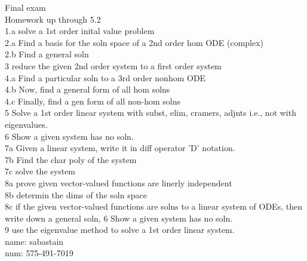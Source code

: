 \documentclass[12pt,a4paper]{article}
\theoremstyle{definition}
\begin{document}
\newpage

Final exam \\
Homework up through 5.2 \\

1.a solve a 1st order inital value problem \\
2.a Find a basis for the soln space of a 2nd order hom ODE (complex)\\
2.b Find a general soln \\
3 reduce the given 2nd order system to a first order system \\
4.a Find a particular soln to a 3rd  order nonhom ODE \\ 
4.b Now, find a general form of all hom solns \\
4.c Finally, find a gen form of all non-hom solns\\
5 Solve a 1st order linear system with subst, elim, cramers, adjnts
i.e., not with eigenvalues. \\
6 Show a given system has no soln. \\
7a Given a linear system, write it in diff operator 'D' notation. \\
7b Find the char poly of the system  \\
7c solve the system \\
8a prove given vector-valued functions are linerly independent \\
8b determin the dims of the soln space \\
8c if the given vector-valued functions are solns to a linear system of
ODEs, then write down a general soln, 6 Show a given system has no
soln.\\
9 use the eigenvalue method to solve a 1st order linear system. \\





name: sabastain \\
num: 575-491-7019 \\
\end{document}
